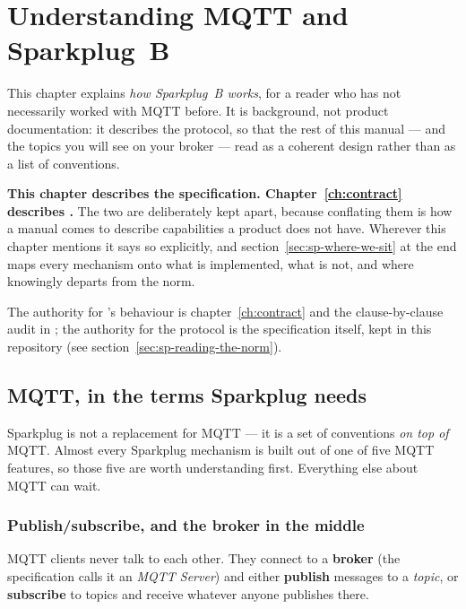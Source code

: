 \chapter{Understanding MQTT and Sparkplug~B}
\label{ch:understanding}

This chapter explains \emph{how Sparkplug~B works}, for a reader who has not necessarily
worked with MQTT before. It is background, not product documentation: it describes the
protocol, so that the rest of this manual --- and the topics you will see on your broker
--- read as a coherent design rather than as a list of conventions.

\begin{note}
\textbf{This chapter describes the specification. Chapter~\ref{ch:contract} describes
\prog.} The two are deliberately kept apart, because conflating them is how a manual comes
to describe capabilities a product does not have. Wherever this chapter mentions \prog it
says so explicitly, and section~\ref{sec:sp-where-we-sit} at the end maps every mechanism
onto what is implemented, what is not, and where \prog knowingly departs from the norm.

The authority for \prog's behaviour is chapter~\ref{ch:contract} and the clause-by-clause
audit in ; the authority for the protocol is the
specification itself, kept in this repository (see
section~\ref{sec:sp-reading-the-norm}).
\end{note}

\section{MQTT, in the terms Sparkplug needs}

Sparkplug is not a replacement for MQTT --- it is a set of conventions \emph{on top of}
MQTT. Almost every Sparkplug mechanism is built out of one of five MQTT features, so those
five are worth understanding first. Everything else about MQTT can wait.

\subsection{Publish/subscribe, and the broker in the middle}

MQTT clients never talk to each other. They connect to a \textbf{broker} (the
specification calls it an \emph{MQTT Server}) and either \textbf{publish} messages to a
\emph{topic}, or \textbf{subscribe} to topics and receive whatever anyone publishes there.

